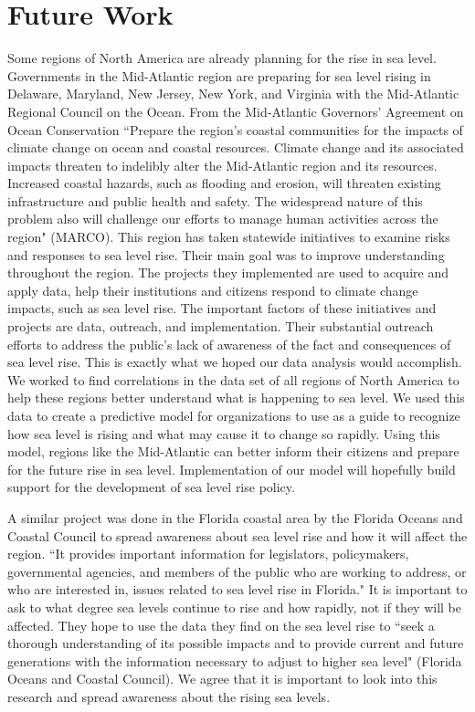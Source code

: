 \documentclass[12pt]{report}
\begin{document}
\section* {Future Work}
\indent \par Some regions of North America are already planning for the rise in sea level. Governments in the Mid-Atlantic region are preparing for sea level rising in Delaware, Maryland, New Jersey, New York, and Virginia with the Mid-Atlantic Regional Council on the Ocean. From the Mid‐Atlantic Governors' Agreement on Ocean Conservation \textquotedblleft Prepare the region’s coastal communities for the impacts of climate change on ocean and coastal resources. Climate change and its associated impacts threaten to indelibly alter the Mid‐Atlantic region and its resources. Increased coastal hazards, such as flooding and erosion, will threaten existing infrastructure and public health and safety. The widespread nature of this problem also will challenge our efforts to manage human activities across the region" (MARCO). This region has taken statewide initiatives to examine risks and responses to sea level rise. Their main goal was to improve understanding throughout the region. The projects they implemented are used to acquire and apply data, help their institutions and citizens respond to climate change impacts, such as sea level rise. The important factors of these initiatives and projects are data, outreach, and implementation. Their substantial outreach efforts to address the public’s lack of awareness of the fact and consequences of sea level rise. This is exactly what we hoped our data analysis would accomplish. We worked to find correlations in the data set of all regions of North America to help these regions better understand what is happening to sea level. We used this data to create a predictive model for organizations to use as a guide to recognize how sea level is rising and what may cause it to change so rapidly. Using this model, regions like the Mid-Atlantic can better inform their citizens and prepare for the future rise in sea level. Implementation of our model will hopefully build support for the development of sea level rise policy. 
\par A similar project was done in the Florida coastal area by the Florida Oceans and Coastal Council to spread awareness about sea level rise and how it will affect the region. \textquotedblleft It provides important information for legislators, policymakers, governmental agencies, and members of the public who are working to address, or who are interested in, issues related to sea level rise in Florida." It is important to ask to what degree sea levels continue to rise and how rapidly, not if they will be affected. They hope to use the data they find on the sea level rise to \textquotedblleft seek a thorough understanding of its possible impacts and to provide current and future generations with the information necessary to adjust to higher sea level" (Florida Oceans and Coastal Council). We agree that it is important to look into this research and spread awareness about the rising sea levels. 
\end{document}
